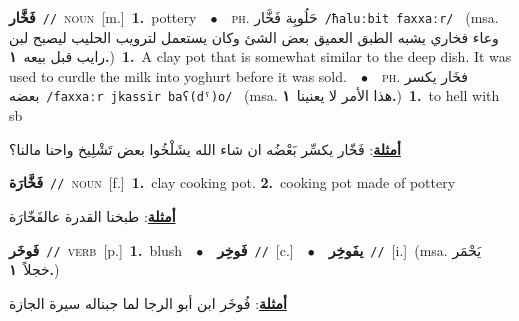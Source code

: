 \documentclass[10pt,a4paper,twoside]{article} %
\begin{document}
\begin{multicols}{2}
{\setlength\topsep{0pt}\textbf{\foreignlanguage{arabic}{فَخَّار}}\ {\color{gray}\texttt{//}\color{black}}\ \textsc{noun}\ [m.]\ \textbf{1.}~pottery\ \ $\bullet$\ \ \textsc{ph.} \color{gray} \foreignlanguage{arabic}{حَلُوبِة فَخَّار}\color{black}\ {\color{gray}\texttt{/{\sffamily ħaluːbit faxxaːr}/}\color{black}}\ \color{gray} (msa. \foreignlanguage{arabic}{وعاء فخاري يشبه الطبق العميق بعض الشئ وكان يستعمل لترويب الحليب ليصبح لبن رايب قبل بيعه}~\foreignlanguage{arabic}{\textbf{١.}})\color{black}\ \textbf{1.}~A clay pot that is somewhat similar to the deep dish. It was used to curdle the milk into yoghurt before it was sold.\ \ $\bullet$\ \ \textsc{ph.} \color{gray} \foreignlanguage{arabic}{فخَار يكسر بعضه}\color{black}\ {\color{gray}\texttt{/{\sffamily faxxaːr jkassir baʕ(dˤ)o}/}\color{black}}\ \color{gray} (msa. \foreignlanguage{arabic}{هذا الأمر لا يعنينا}~\foreignlanguage{arabic}{\textbf{١.}})\color{black}\ \textbf{1.}~to hell with sb\  \begin{flushright}\color{gray}\foreignlanguage{arabic}{\textbf{\underline{\foreignlanguage{arabic}{أمثلة}}}: فَخّار يكسِّر بَعْضُه ان شاء الله يشَلْخُوا بعض تَشْلِيخ واحنا مالنا؟}\end{flushright}\color{black}} \vspace{2mm}

{\setlength\topsep{0pt}\textbf{\foreignlanguage{arabic}{فَخَّارَة}}\ {\color{gray}\texttt{//}\color{black}}\ \textsc{noun}\ [f.]\ \textbf{1.}~clay cooking pot.  \textbf{2.}~cooking pot made of pottery\  \begin{flushright}\color{gray}\foreignlanguage{arabic}{\textbf{\underline{\foreignlanguage{arabic}{أمثلة}}}: طبخنا القدرة عالفَخّارَة}\end{flushright}\color{black}} \vspace{2mm}

{\setlength\topsep{0pt}\textbf{\foreignlanguage{arabic}{فَوخَر}}\ {\color{gray}\texttt{//}\color{black}}\ \textsc{verb}\ [p.]\ \textbf{1.}~blush\ \ $\bullet$\ \ \setlength\topsep{0pt}\textbf{\foreignlanguage{arabic}{فَوخِر}}\ {\color{gray}\texttt{//}\color{black}}\ [c.]\ \ $\bullet$\ \ \setlength\topsep{0pt}\textbf{\foreignlanguage{arabic}{يفَوخِر}}\ {\color{gray}\texttt{//}\color{black}}\ [i.]\ \color{gray}(msa. \foreignlanguage{arabic}{يَحْمَر خجلاً}~\foreignlanguage{arabic}{\textbf{١.}})\color{black}\  \begin{flushright}\color{gray}\foreignlanguage{arabic}{\textbf{\underline{\foreignlanguage{arabic}{أمثلة}}}: فُوخَر ابن أبو الرجا لما جبناله سيرة الجازة}\end{flushright}\color{black}} \vspace{2mm}


\end{multicols}
\end{document}
